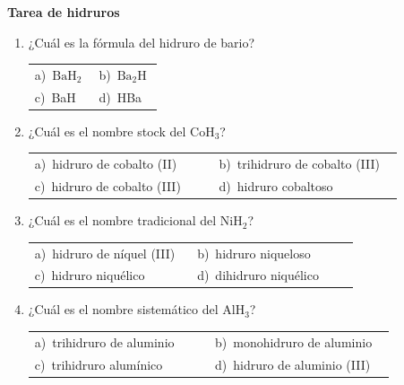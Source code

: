\documentclass[11pt,a4paper]{article}
\begin{document}
{\Large\bfseries Tarea de hidruros}
\vspace{12pt}
\begin{enumerate}[label=\textbf{\arabic*.},leftmargin=*,itemsep=11pt,topsep=0pt]
\item \begin{minipage}[t]{\linewidth}
¿Cuál es la fórmula del hidruro de bario?

\vspace{5pt}
\begin{tabular}{@{}p{0.47\linewidth}p{0.47\linewidth}@{}}
a)~$\mathrm{BaH_{2}}$ & b)~$\mathrm{Ba_{2}H}$ \\
c)~BaH & d)~HBa \\
\end{tabular}
\end{minipage}

\item \begin{minipage}[t]{\linewidth}
¿Cuál es el nombre stock del $\mathrm{CoH_{3}}$?

\vspace{5pt}
\begin{tabular}{@{}p{0.47\linewidth}p{0.47\linewidth}@{}}
a)~hidruro de cobalto (II) & b)~trihidruro de cobalto (III) \\
c)~hidruro de cobalto (III) & d)~hidruro cobaltoso \\
\end{tabular}
\end{minipage}

\item \begin{minipage}[t]{\linewidth}
¿Cuál es el nombre tradicional del $\mathrm{NiH_{2}}$?

\vspace{5pt}
\begin{tabular}{@{}p{0.47\linewidth}p{0.47\linewidth}@{}}
a)~hidruro de níquel (III) & b)~hidruro niqueloso \\
c)~hidruro niquélico & d)~dihidruro niquélico \\
\end{tabular}
\end{minipage}

\item \begin{minipage}[t]{\linewidth}
¿Cuál es el nombre sistemático del $\mathrm{AlH_{3}}$?

\vspace{5pt}
\begin{tabular}{@{}p{0.47\linewidth}p{0.47\linewidth}@{}}
a)~trihidruro de aluminio & b)~monohidruro de aluminio \\
c)~trihidruro alumínico & d)~hidruro de aluminio (III) \\
\end{tabular}
\end{minipage}


\end{enumerate}
\end{document}
